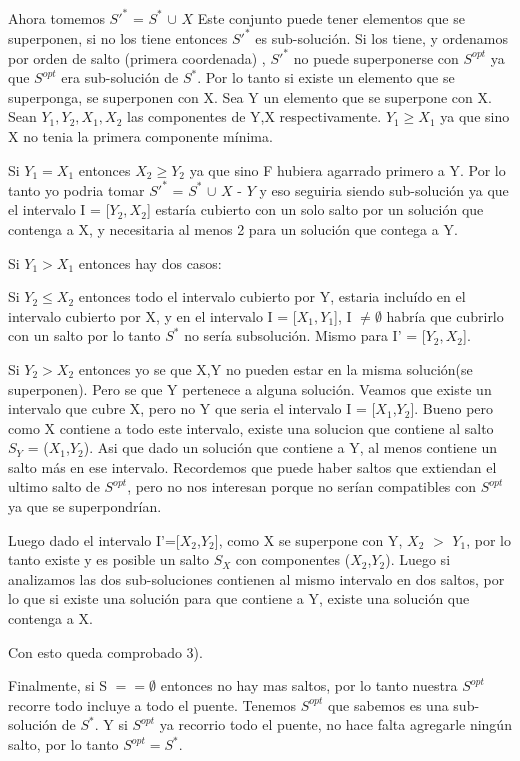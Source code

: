 Ahora tomemos $S'^{*}$ = $S^{*}$ $\cup$ ${X}$
Este conjunto puede tener elementos que se superponen, si no los tiene entonces 
$S'^{*}$ es sub-soluci\'on.
Si los tiene, y ordenamos por orden de salto (primera coordenada) , $S'^{*}$ no puede superponerse con $S^{opt}$ ya que $S^{opt}$ era sub-soluci\'on de $S^{*}$.
Por lo tanto si existe un elemento que se superponga, se superponen con X.
Sea Y un elemento que se superpone con X.
Sean $Y_{1},Y_{2},X_{1},X_{2}$ las componentes de Y,X respectivamente.
$Y_{1}\geq X_{1}$ ya que sino X no tenia la primera componente m\'inima.

Si $Y_{1} = X_{1}$ entonces $X_{2} \geq Y_{2}$ ya que sino F hubiera agarrado primero a Y. Por lo tanto yo podria tomar $S'^{*}$ = $S^{*}$ $\cup$ ${X}$ - ${Y}$ y eso seguiria siendo sub-soluci\'on ya que el intervalo I = [$Y_{2},X_{2}$] estar\'ia cubierto con un solo salto por un soluci\'on que contenga a X, y necesitaria al menos 2 para un soluci\'on que contega a Y.

Si $Y_{1} > X_{1}$ entonces hay dos casos:

Si $Y_{2} \leq X_{2}$ entonces todo el intervalo cubierto por Y, estaria inclu\'ido en el intervalo cubierto por X, y en el intervalo I = [$X_{1},Y_{1}$], I $\neq \emptyset$ habr\'ia que cubrirlo con un salto por lo tanto $S^{*}$ no ser\'ia subsoluci\'on. Mismo para I' =  [$Y_{2},X_{2}$].

Si $Y_{2} > X_{2}$ entonces yo se que X,Y no pueden estar en la misma soluci\'on(se superponen). Pero se que Y pertenece a alguna soluci\'on. Veamos que existe un intervalo que cubre X, pero no Y que seria el intervalo I = [$X_{1}$,$Y_{2}$].
Bueno pero como X contiene a todo este intervalo, existe una solucion que contiene al salto $S_{Y}$ = ($X_{1}$,$Y_{2}$). Asi que dado un soluci\'on que contiene a Y, al menos contiene un salto m\'as en ese intervalo. Recordemos que puede haber saltos que extiendan el ultimo salto de $S^{opt}$, pero no nos interesan porque no ser\'ian compatibles con $S^{opt}$ ya que se superpondr\'ian.
 
Luego dado el intervalo I'=[$X_{2}$,$Y_{2}$], como X se superpone con Y, $X_{2}$ $>$ $Y_{1}$, por lo tanto existe y es posible un salto $S_{X}$ con componentes ($X_{2}$,$Y_{2}$).
Luego si analizamos las dos sub-soluciones contienen al mismo intervalo en dos saltos, por lo que si existe una soluci\'on para que contiene a Y, existe una soluci\'on que contenga a X. 

Con esto queda comprobado 3).

Finalmente, si S $== \emptyset$ entonces no hay mas saltos, por lo tanto nuestra $S^{opt}$ recorre todo incluye a todo el puente.
Tenemos $S^{opt}$  que sabemos es una sub-soluci\'on de $S^{*}$. Y si $S^{opt}$ ya recorrio todo el puente, no hace falta agregarle ning\'un salto, por lo tanto $S^{opt} =S^{*}$.  

